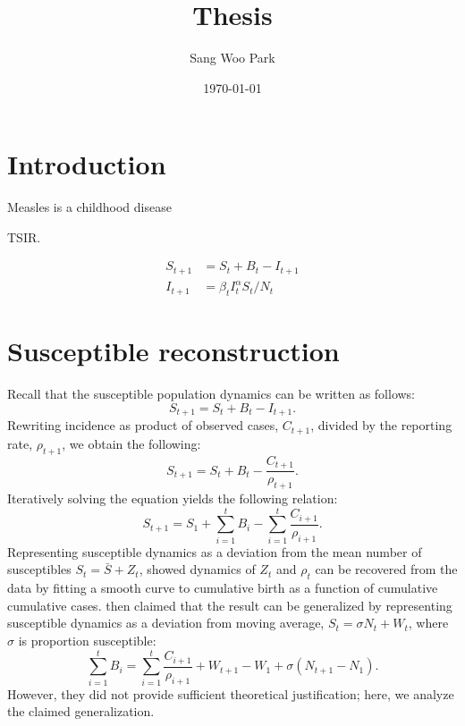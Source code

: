 \documentclass{article}
\title{Thesis}
\date{\today}
\author{Sang Woo Park}
\begin{document}
\maketitle

\section{Introduction}

Measles is a childhood disease 

TSIR.

\begin{equation}
\begin{aligned}
S_{t+1} &= S_t + B_t - I_{t+1}\\
I_{t+1} &= \beta_t I_{t}^\alpha S_t/N_t
\end{aligned}
\end{equation}

\section{Susceptible reconstruction}

Recall that the susceptible population dynamics can be written as follows:
\begin{equation}
S_{t+1} = S_{t} + B_t - I_{t+1}.
\end{equation}
Rewriting incidence as product of observed cases, $C_{t+1}$, divided by the reporting rate, $\rho_{t+1}$, we obtain the following:
\begin{equation}
S_{t+1} = S_t + B_t - \frac{C_{t+1}}{\rho_{t+1}}.
\end{equation}
Iteratively solving the equation yields the following relation:
\begin{equation}
S_{t+1} =  S_1 + \sum_{i=1}^t B_i - \sum_{i=1}^t \frac{C_{i+1}}{\rho_{i+1}}.
\label{eq:sus}
\end{equation}
Representing susceptible dynamics as a deviation from the mean number of susceptibles $S_t = \bar{S} + Z_t$, \cite{finkenstadt2000time} showed dynamics of $Z_t$ and $\rho_t$ can be recovered from the data by fitting a smooth curve to cumulative birth as a function of cumulative cumulative cases. 
\cite{dalziel2016persistent} then claimed that the result can be generalized by representing susceptible dynamics as a deviation from moving average, $S_t = \sigma N_t + W_t$, where $\sigma$ is proportion susceptible:
\begin{equation}
\sum_{i=1}^t B_i = \sum_{i=1}^t \frac{C_{i+1}}{\rho_{i+1}} + W_{t+1} - W_1 + \sigma (N_{t+1} - N_1).
\label{eq:gensus}
\end{equation}
However, they did not provide sufficient theoretical justification; here, we analyze the claimed generalization.
\end{document}
